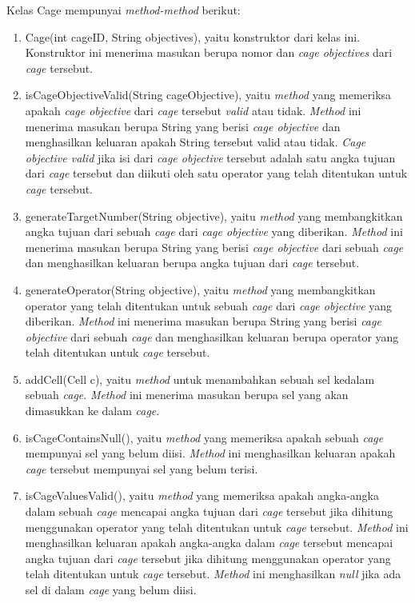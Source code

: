 Kelas Cage mempunyai \textit{method-method} berikut:

\begin{enumerate}
\item Cage(int cageID, String objectives), yaitu konstruktor dari kelas ini. Konstruktor ini menerima masukan berupa nomor dan \textit{cage objectives} dari \textit{cage} tersebut.
\item isCageObjectiveValid(String cageObjective), yaitu \textit{method} yang memeriksa apakah \textit{cage objective} dari \textit{cage} tersebut \textit{valid} atau tidak. \textit{Method} ini menerima masukan berupa String yang berisi \textit{cage objective} dan menghasilkan keluaran apakah String tersebut valid atau tidak. \textit{Cage objective valid} jika isi dari \textit{cage objective} tersebut adalah satu angka tujuan dari \textit{cage} tersebut dan diikuti oleh satu operator yang telah ditentukan untuk \textit{cage} tersebut.
\item generateTargetNumber(String objective), yaitu \textit{method} yang membangkitkan angka tujuan dari sebuah \textit{cage} dari \textit{cage objective} yang diberikan. \textit{Method} ini menerima masukan berupa String yang berisi \textit{cage objective} dari sebuah \textit{cage} dan menghasilkan keluaran berupa angka tujuan dari \textit{cage} tersebut.
\item generateOperator(String objective), yaitu \textit{method} yang membangkitkan operator yang telah ditentukan untuk sebuah \textit{cage} dari \textit{cage objective} yang diberikan. \textit{Method} ini menerima masukan berupa String yang berisi \textit{cage objective} dari sebuah \textit{cage} dan menghasilkan keluaran berupa operator yang telah ditentukan untuk \textit{cage} tersebut.
\item addCell(Cell c), yaitu \textit{method} untuk menambahkan sebuah sel kedalam sebuah \textit{cage}. \textit{Method} ini menerima masukan berupa sel yang akan dimasukkan ke dalam \textit{cage}.
\item isCageContainsNull(), yaitu \textit{method} yang memeriksa apakah sebuah \textit{cage} mempunyai sel yang belum diisi. \textit{Method} ini menghasilkan keluaran apakah \textit{cage} tersebut mempunyai sel yang belum terisi.
\item isCageValuesValid(), yaitu \textit{method} yang memeriksa apakah angka-angka dalam sebuah \textit{cage} mencapai angka tujuan dari \textit{cage} tersebut jika dihitung menggunakan operator yang telah ditentukan untuk \textit{cage} tersebut. \textit{Method} ini menghasilkan keluaran apakah angka-angka dalam \textit{cage} tersebut mencapai angka tujuan dari \textit{cage} tersebut jika dihitung menggunakan operator yang telah ditentukan untuk \textit{cage} tersebut. \textit{Method} ini menghasilkan \textit{null} jika ada sel di dalam \textit{cage} yang belum diisi.

\end{enumerate}
